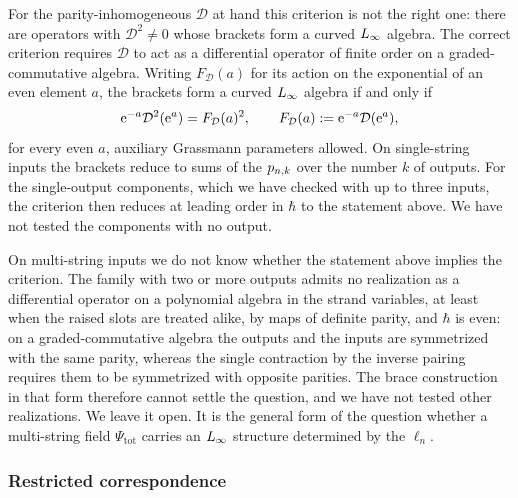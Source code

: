 For the parity-inhomogeneous $\mathcal D$ at hand this criterion is not the right one: there are operators with $\mathcal D^2 \neq 0$ whose brackets form a curved $L_\infty$ algebra.
The correct criterion requires $\mathcal D$ to act as a differential operator of finite order on a graded-commutative algebra.
Writing $F_{\mathcal D}(a)$ for its action on the exponential of an even element $a$, the brackets form a curved $L_\infty$ algebra if and only if
\begin{equation}
  \label{p:eq:ibl:brace-criterion}
  \mathrm{e}^{-a} \mathcal D^2(\mathrm{e}^{a})
    = F_{\mathcal D}(a)^2,
  \qquad
  F_{\mathcal D}(a)
    := \mathrm{e}^{-a} \mathcal D(\mathrm{e}^{a}),
\end{equation}
for every even $a$, auxiliary Grassmann parameters allowed.
On single-string inputs the brackets reduce to sums of the $p_{n,k}$ over the number $k$ of outputs.
For the single-output components, which we have checked with up to three inputs, the criterion then reduces at leading order in $\hbar$ to the statement above.
We have not tested the components with no output.

On multi-string inputs we do not know whether the statement above implies the criterion.
The family with two or more outputs admits no realization as a differential operator on a polynomial algebra in the strand variables, at least when the raised slots are treated alike, by maps of definite parity, and $\hbar$ is even: on a graded-commutative algebra the outputs and the inputs are symmetrized with the same parity, whereas the single contraction by the inverse pairing requires them to be symmetrized with opposite parities.
The brace construction in that form therefore cannot settle the question, and we have not tested other realizations.
We leave it open.
It is the general form of the question whether a multi-string field $\Psi_{\mathrm{tot}}$ carries an $L_\infty$ structure determined by the $\ell_n$.

\subsubsection{Restricted correspondence}
\label{p:sec:ibl:restricted}


